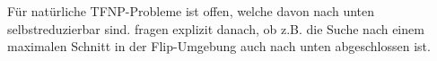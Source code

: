 Für natürliche  TFNP-Probleme ist offen, welche davon nach unten selbstreduzierbar sind. 
\citeauthor{harsha_downward_2023} fragen explizit danach, ob z.B. die Suche nach einem maximalen Schnitt in der Flip-Umgebung auch nach unten abgeschlossen ist.




